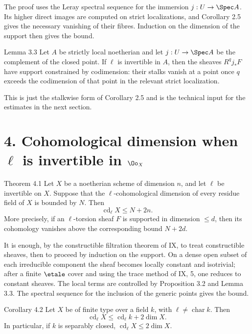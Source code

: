 \begin{prooftext}
The proof uses the Leray spectral sequence for the immersion \(j:U\to\Spec A\). Its higher direct images are computed on strict localizations, and Corollary 2.5 gives the necessary vanishing of their fibres. Induction on the dimension of the support then gives the bound.
\end{prooftext}

\begin{statement}{Lemma 3.3}
Let \(A\) be strictly local noetherian and let \(j:U\to\Spec A\) be the complement of the closed point. If \(\ell\) is invertible in \(A\), then the sheaves \(R^qj_*F\) have support constrained by codimension: their stalks vanish at a point once \(q\) exceeds the codimension of that point in the relevant strict localization.
\end{statement}

This is just the stalkwise form of Corollary 2.5 and is the technical input for the estimates in the next section.

\section*{4. Cohomological dimension when \(\ell\) is invertible in \(\Oo_X\)}

\begin{statement}{Theorem 4.1}
Let \(X\) be a noetherian scheme of dimension \(n\), and let \(\ell\) be invertible on \(X\). Suppose that the \(\ell\)-cohomological dimension of every residue field of \(X\) is bounded by \(N\). Then
\[
\operatorname{cd}_\ell X\leq N+2n.
\]
More precisely, if an \(\ell\)-torsion sheaf \(F\) is supported in dimension \(\leq d\), then its cohomology vanishes above the corresponding bound \(N+2d\).
\end{statement}

\begin{prooftext}
It is enough, by the constructible filtration theorem of IX, to treat constructible sheaves, then to proceed by induction on the support. On a dense open subset of each irreducible component the sheaf becomes locally constant and isotrivial; after a finite \(\etale\) cover and using the trace method of IX, 5, one reduces to constant sheaves. The local terms are controlled by Proposition 3.2 and Lemma 3.3. The spectral sequence for the inclusion of the generic points gives the bound.
\end{prooftext}

\begin{statement}{Corollary 4.2}
Let \(X\) be of finite type over a field \(k\), with \(\ell\ne\operatorname{char}k\). Then
\[
\operatorname{cd}_\ell X\leq \operatorname{cd}_\ell k+2\dim X.
\]
In particular, if \(k\) is separably closed, \(\operatorname{cd}_\ell X\leq2\dim X\).
\end{statement}

